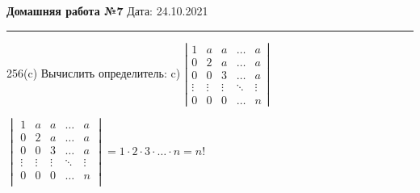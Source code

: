 \noindent
\large\textbf{Домашняя работа №7} \hfill  Дата: 24.10.2021  \\
\noindent\rule{7in}{2pt}

\begin{problem}{256(c)}
Вычислить определитель:
c) $\left| \begin{array}{ccccc}1 & a & a & \ldots & a\\ 0 & 2 & a & \ldots & a \\ 0 & 0 & 3 & \ldots & a \\ \vdots & \vdots & \vdots & \ddots & \vdots \\ 0 & 0 & 0 & \ldots & n \end{array} \right|$ \\
\end{problem}
\begin{solution}

$
\begin{vmatrix}
	1 & a & a & \ldots & a\\
	0 & 2 & a & \ldots & a \\
	0 & 0 & 3 & \ldots & a \\
	\vdots & \vdots & \vdots & \ddots & \vdots \\
	0 & 0 & 0 & \ldots & n\\
\end{vmatrix} = 1 \cdot 2 \cdot 3 \cdot \ldots \cdot n = n!
$\\

\end{solution} 

